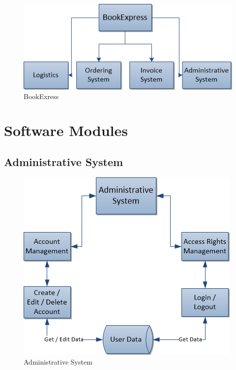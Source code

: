 \documentclass[11pt,a4paper,oneside,svgnames]{report}
\begin{document}
\begin{figure}[H]
 \begin{center}
  \includegraphics[width=\textwidth]{BookExpress.png}
 \end{center}
 \caption{BookExress}
\end{figure}

\chapter{Software Modules}

\section{Administrative System}

\begin{figure}[H]
 \begin{center}
  \includegraphics[width=\textwidth]{Administrative System.png}
 \end{center}
 \caption{Administrative System}
\end{figure}
\end{document}
